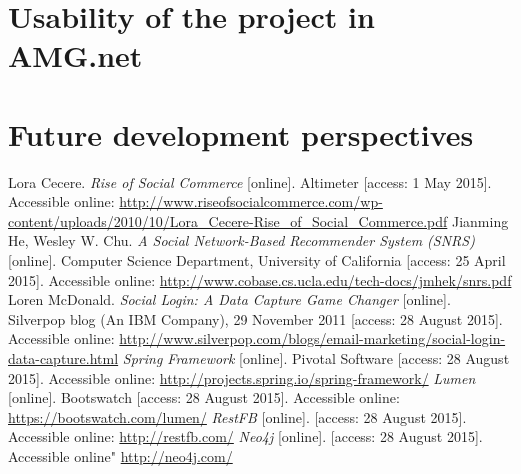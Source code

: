 \documentclass[12pt]{report}
\begin{document}
\section{Usability of the project in AMG.net}
\section{Future development perspectives}



\begin{thebibliography}{99}
Lora Cecere. \textit{Rise of Social Commerce} [online]. Altimeter [access: 1 May 2015]. Accessible online: \url{http://www.riseofsocialcommerce.com/wp-content/uploads/2010/10/Lora_Cecere-Rise_of_Social_Commerce.pdf}
Jianming He, Wesley W. Chu. \textit{A Social Network-Based Recommender System (SNRS)} [online]. Computer Science Department, University of California [access: 25 April 2015]. Accessible online: \url{http://www.cobase.cs.ucla.edu/tech-docs/jmhek/snrs.pdf}
Loren McDonald. \textit{Social Login: A Data Capture Game Changer} [online]. Silverpop blog (An IBM Company), 29 November 2011 [access: 28 August 2015]. Accessible online: \url{http://www.silverpop.com/blogs/email-marketing/social-login-data-capture.html}
\textit{Spring Framework} [online]. Pivotal Software [access: 28 August 2015]. Accessible online: \url{http://projects.spring.io/spring-framework/}
\textit{Lumen} [online]. Bootswatch [access: 28 August 2015]. Accessible online: \url{https://bootswatch.com/lumen/}
\textit{RestFB} [online]. [access: 28 August 2015]. Accessible online: \url{http://restfb.com/}
\textit{Neo4j} [online]. [access: 28 August 2015]. Accessible online" \url{http://neo4j.com/}

\end{thebibliography}
\end{document}

